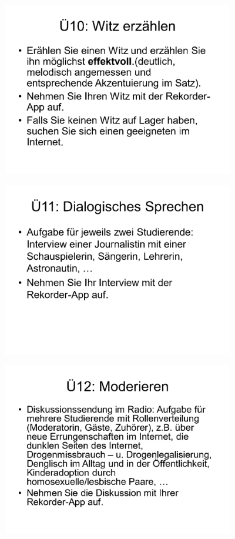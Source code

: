 \documentclass[
  letterpaper,
]{scrbook}
\begin{document}
\includegraphics[width=4in,height=\textheight]{./pictures/sprachlabor/Phonetikuebungen_S01_Page28.png}

\includegraphics[width=4in,height=\textheight]{./pictures/sprachlabor/Phonetikuebungen_S01_Page29.png}

\includegraphics[width=4in,height=\textheight]{./pictures/sprachlabor/Phonetikuebungen_S01_Page30.png}
\end{document}

